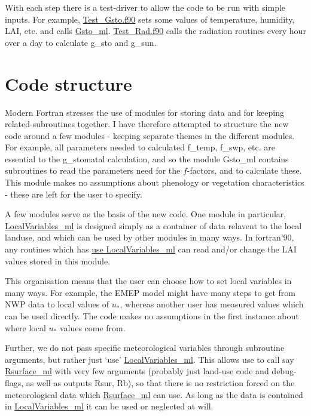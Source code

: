 \documentclass[12pt]{article}
\begin{document}
\vspace{1cm}

With each step there is a
test-driver to allow the code to be run with simple inputs. For example,
\url{Test_Gsto.f90} sets some values of temperature, humidity, LAI, etc. 
and calls \url{Gsto_ml}. \url{Test_Rad.f90} calls the radiation routines
every hour over a day to calculate g\_sto and g\_sun.


\section{Code structure}

Modern Fortran stresses the use of modules for storing data and for keeping related-subroutines
together. I have therefore attempted to structure the new code around a few
modules - keeping separate themes in the different modules.  
For example, all parameters needed to calculated f\_temp, f\_swp, etc. are
essential to the  g\_stomatal calculation, and so the module Gsto\_ml
contains subroutines to read the parameters need for the $f$-factors, and
to calculate these. This module makes no assumptions about phenology
or vegetation characteristics - these are left for the user to specify.

\vspace{1cm}

A few modules serve as the basis of the new code. One module in
particular, \url{LocalVariables_ml} is designed simply as a container
of data relavent to the local landuse, and  which can be used by  other
modules in many ways. In fortran'90, any routines which has
\url{use LocalVariables_ml} can read and/or change the LAI values stored
in this module. 

This organisation means that the user can choose how to set local
variables in many ways. For example, the EMEP model might have many steps
to get from NWP data to local values of $u_*$, whereas another user
has  measured values which can be used directly.  The code makes no
assumptions in the first instance about where local $u_*$ values come from.

Further, we do not pass specific meteorological variables through
subroutine arguments, but rather just `use' \url{LocalVariables_ml}.
This allows use to call say \url{Rsurface_ml} with very few
arguments (probably just land-use code and debug-flags, as well
as outputs Rsur, Rb), so that
there is no restriction forced on the meteorological data which
\url{Rsurface_ml} can use. As long as the data is contained in
\url{LocalVariables_ml} it can  be used or neglected at will.
\end{document}
